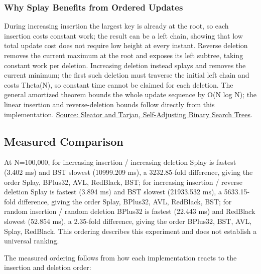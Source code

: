 \subsubsection{Why Splay Benefits from Ordered Updates}

During increasing insertion the largest key is already at the root, so each insertion costs constant work; the result can be a left chain, showing that low total update cost does not require low height at every instant. Reverse deletion removes the current maximum at the root and exposes its left subtree, taking constant work per deletion. Increasing deletion instead splays and removes the current minimum; the first such deletion must traverse the initial left chain and costs Theta(N), so constant time cannot be claimed for each deletion. The general amortized theorem bounds the whole update sequence by O(N log N); the linear insertion and reverse-deletion bounds follow directly from this implementation. \href{https://www.cs.cmu.edu/~sleator/papers/self-adjusting.pdf}{Source: Sleator and Tarjan, Self-Adjusting Binary Search Trees}.

\subsection{Measured Comparison}

At N=100,000, for increasing insertion /\allowbreak{} increasing deletion Splay is fastest (3.402 ms) and BST slowest (10999.209 ms), a 3232.85-fold difference, giving the order Splay, BPlus32, AVL, RedBlack, BST; for increasing insertion /\allowbreak{} reverse deletion Splay is fastest (3.894 ms) and BST slowest (21933.532 ms), a 5633.15-fold difference, giving the order Splay, BPlus32, AVL, RedBlack, BST; for random insertion /\allowbreak{} random deletion BPlus32 is fastest (22.443 ms) and RedBlack slowest (52.854 ms), a 2.35-fold difference, giving the order BPlus32, BST, AVL, Splay, RedBlack. This ordering describes this experiment and does not establish a universal ranking.

The measured ordering follows from how each implementation reacts to the insertion and deletion order:

